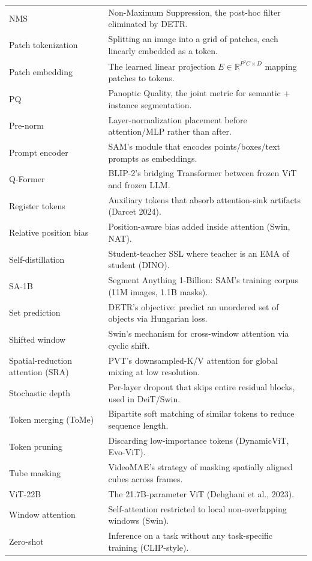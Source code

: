 {\begin{longtable}[]{@{}
  >{\raggedright\arraybackslash}p{}
  >{\raggedright\arraybackslash}p{}@{}}
NMS & Non-Maximum Suppression, the post-hoc filter eliminated by DETR. \\
Patch tokenization & Splitting an image into a grid of patches, each linearly embedded as a token. \\
Patch embedding & The learned linear projection \(E \in \mathbb{R}^{P^2C \times D}\) mapping patches to tokens. \\
PQ & Panoptic Quality, the joint metric for semantic + instance segmentation. \\
Pre-norm & Layer-normalization placement before attention/MLP rather than after. \\
Prompt encoder & SAM's module that encodes points/boxes/text prompts as embeddings. \\
Q-Former & BLIP-2's bridging Transformer between frozen ViT and frozen LLM. \\
Register tokens & Auxiliary tokens that absorb attention-sink artifacts (Darcet 2024). \\
Relative position bias & Position-aware bias added inside attention (Swin, NAT). \\
Self-distillation & Student-teacher SSL where teacher is an EMA of student (DINO). \\
SA-1B & Segment Anything 1-Billion: SAM's training corpus (11M images, 1.1B masks). \\
Set prediction & DETR's objective: predict an unordered set of objects via Hungarian loss. \\
Shifted window & Swin's mechanism for cross-window attention via cyclic shift. \\
Spatial-reduction attention (SRA) & PVT's downsampled-K/V attention for global mixing at low resolution. \\
Stochastic depth & Per-layer dropout that skips entire residual blocks, used in DeiT/Swin. \\
Token merging (ToMe) & Bipartite soft matching of similar tokens to reduce sequence length. \\
Token pruning & Discarding low-importance tokens (DynamicViT, Evo-ViT). \\
Tube masking & VideoMAE's strategy of masking spatially aligned cubes across frames. \\
ViT-22B & The 21.7B-parameter ViT (Dehghani et al., 2023). \\
Window attention & Self-attention restricted to local non-overlapping windows (Swin). \\
Zero-shot & Inference on a task without any task-specific training (CLIP-style). \\
\end{longtable}
}

